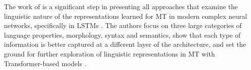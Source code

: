 The work of \citet{belinkov2020linguistic} is a significant step in presenting all approaches that examine the linguistic nature of the representations learned for MT in modern complex neural networks, specifically in LSTMs \citep{bahdanau2014neural}. The authors focus on three large categories of language properties, morphology, syntax and semantics, show that each type of information is better captured at a different layer of the architecture, and set the ground for further exploration of linguistic representations in MT with Transformer-based models \citep{vaswani2017attention}.